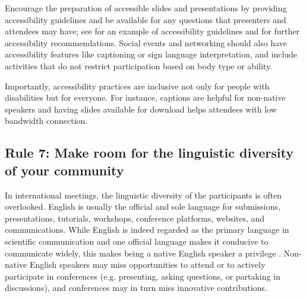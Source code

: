 \documentclass[10pt,letterpaper]{article}
\begin{document}
Encourage the preparation of accessible slides and presentations by providing accessibility guidelines and be available for any questions that presenters and attendees may have; see \cite{sanchez-tapia_user_2021} for an example of accessibility guidelines and \cite{chavez_preparing_2021, sanchez-tapia_making_2021, joo_how_2021} for further accessibility recommendations.
Social events and networking should also have accessibility features like captioning or sign language interpretation, and include activities that do not restrict participation based on body type or ability.

Importantly, accessibility practices are inclusive not only for people with disabilities but for everyone.
For instance, captions are helpful for non-native speakers and having slides available for download helps attendees with low bandwidth connection. 


\subsection*{Rule 7: Make room for the linguistic diversity of your community}
\label{rule_language}

In international meetings, the linguistic diversity of the participants is often overlooked. 
English is usually the official and sole language for submissions, presentations, tutorials, workshops, conference platforms, websites, and communications. 
While English is indeed regarded as the primary language in scientific communication and one official language makes it conducive to communicate widely, this makes being a native English speaker a privilege \cite{amanoTenTipsOvercoming2021}. 
Non-native English speakers may miss opportunities to attend or to actively participate in conferences (e.g. presenting, asking questions, or partaking in discussions),
and conferences may in turn miss innovative contributions.
\end{document}

